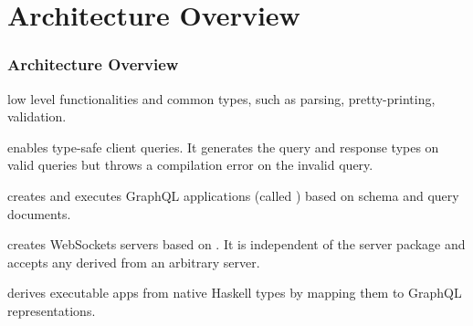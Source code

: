 \section{Architecture Overview}

\begin{frame}\frametitle{Architecture Overview}

\begin{enumerate} 

  \footnotesize
  
   low level functionalities and common types, such as  parsing, pretty-printing, validation.

   enables type-safe client queries. It generates the query and response types on valid queries but throws a compilation error on the invalid query.

   creates and executes GraphQL applications (called ) based on schema and query documents.
  
    creates WebSockets servers based on . It is independent of the server package and accepts any  derived from an arbitrary server.

   derives executable apps from native Haskell types by mapping them to GraphQL representations. 

\end{enumerate}

\end{frame}

\begin{frame}

\end{frame}
